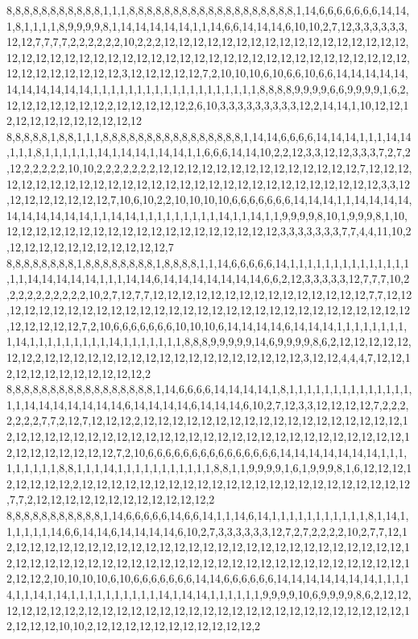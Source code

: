 8,8,8,8,8,8,8,8,8,8,8,1,1,1,8,8,8,8,8,8,8,8,8,8,8,8,8,8,8,8,8,8,8,1,14,6,6,6,6,6,6,6,14,14,1,8,1,1,1,1,8,9,9,9,9,8,1,14,14,14,14,14,1,1,14,6,6,14,14,14,6,10,10,2,7,12,3,3,3,3,3,3,12,12,7,7,7,7,2,2,2,2,2,2,10,2,2,2,12,12,12,12,12,12,12,12,12,12,12,12,12,12,12,12,12,12,12,12,12,12,12,12,12,12,12,12,12,12,12,12,12,12,12,12,12,12,12,12,12,12,12,12,12,12,12,12,12,12,12,12,12,3,12,12,12,12,12,7,2,10,10,10,6,10,6,6,10,6,6,14,14,14,14,14,14,14,14,14,14,14,1,1,1,1,1,1,1,1,1,1,1,1,1,1,1,1,1,1,1,8,8,8,8,9,9,9,9,6,6,9,9,9,9,1,6,2,12,12,12,12,12,12,12,2,12,12,12,12,12,2,6,10,3,3,3,3,3,3,3,3,3,12,2,14,14,1,10,12,12,12,12,12,12,12,12,12,12,12,12
8,8,8,8,8,1,8,8,1,1,1,8,8,8,8,8,8,8,8,8,8,8,8,8,8,8,8,1,14,14,6,6,6,6,14,14,14,1,1,1,14,14,1,1,1,8,1,1,1,1,1,1,14,1,14,14,1,14,14,1,1,6,6,6,14,14,10,2,2,12,3,3,12,12,3,3,3,7,2,7,2,12,2,2,2,2,2,10,10,2,2,2,2,2,2,2,12,12,12,12,12,12,12,12,12,12,12,12,12,12,7,12,12,12,12,12,12,12,12,12,12,12,12,12,12,12,12,12,12,12,12,12,12,12,12,12,12,12,12,12,3,3,12,12,12,12,12,12,12,12,7,10,6,10,2,2,10,10,10,10,6,6,6,6,6,6,6,14,14,14,1,1,14,14,14,14,14,14,14,14,14,14,1,1,14,14,1,1,1,1,1,1,1,1,1,14,1,1,14,1,1,9,9,9,9,8,10,1,9,9,9,8,1,10,12,12,12,12,12,12,12,12,12,12,12,12,12,12,12,12,12,12,12,3,3,3,3,3,3,3,7,7,4,4,11,10,2,12,12,12,12,12,12,12,12,12,12,12,7
8,8,8,8,8,8,8,8,1,8,8,8,8,8,8,8,8,1,8,8,8,8,1,1,14,6,6,6,6,6,14,1,1,1,1,1,1,1,1,1,1,1,1,1,1,1,1,14,14,14,14,14,1,1,1,14,14,6,14,14,14,14,14,14,14,6,6,2,12,3,3,3,3,3,12,7,7,7,10,2,2,2,2,2,2,2,2,2,2,10,2,7,12,7,7,12,12,12,12,12,12,12,12,12,12,12,12,12,12,12,7,7,12,12,12,12,12,12,12,12,12,12,12,12,12,12,12,12,12,12,12,12,12,12,12,12,12,12,12,12,12,12,12,12,12,12,12,7,2,10,6,6,6,6,6,6,6,10,10,10,6,14,14,14,14,6,14,14,14,1,1,1,1,1,1,1,1,1,14,1,1,1,1,1,1,1,1,1,14,1,1,1,1,1,1,1,8,8,8,9,9,9,9,9,14,6,9,9,9,9,8,6,2,12,12,12,12,12,12,12,2,12,12,12,12,12,12,12,12,12,12,12,12,12,12,12,12,12,12,3,12,12,4,4,4,7,12,12,12,12,12,12,12,12,12,12,12,12,2
8,8,8,8,8,8,8,8,8,8,8,8,8,8,8,8,8,1,14,6,6,6,6,14,14,14,14,1,8,1,1,1,1,1,1,1,1,1,1,1,1,1,1,1,1,14,14,14,14,14,14,14,6,14,14,14,14,6,14,14,14,6,10,2,7,12,3,3,12,12,12,12,7,2,2,2,2,2,2,2,7,7,2,12,7,12,12,12,2,12,12,12,12,12,12,12,12,12,12,12,12,12,12,12,12,12,12,12,12,12,12,12,12,12,12,12,12,12,12,12,12,12,12,12,12,12,12,12,12,12,12,12,12,12,12,12,12,12,12,12,12,12,12,7,2,10,6,6,6,6,6,6,6,6,6,6,6,6,6,6,6,14,14,14,14,14,14,14,1,1,1,1,1,1,1,1,1,8,8,1,1,1,14,1,1,1,1,1,1,1,1,1,1,1,8,8,1,1,9,9,9,9,1,6,1,9,9,9,8,1,6,12,12,12,12,12,12,12,12,2,12,12,12,12,12,12,12,12,12,12,12,12,12,12,12,12,12,12,12,12,12,12,12,7,7,2,12,12,12,12,12,12,12,12,12,12,12,12,2
8,8,8,8,8,8,8,8,8,8,8,1,14,6,6,6,6,6,14,6,6,14,1,1,14,6,14,1,1,1,1,1,1,1,1,1,1,1,8,1,14,1,1,1,1,1,1,14,6,6,14,14,6,14,14,14,14,6,10,2,7,3,3,3,3,3,3,12,7,2,7,2,2,2,2,10,2,7,7,12,12,12,12,12,12,12,12,12,12,12,12,12,12,12,12,12,12,12,12,12,12,12,12,12,12,12,12,12,12,12,12,12,12,12,12,12,12,12,12,12,12,12,12,12,12,12,12,12,12,12,12,12,12,12,12,12,12,12,12,2,10,10,10,10,6,10,6,6,6,6,6,6,6,14,14,6,6,6,6,6,6,14,14,14,14,14,14,14,1,1,1,14,1,1,14,1,14,1,1,1,1,1,1,1,1,1,1,14,1,14,14,1,1,1,1,1,1,9,9,9,9,10,6,9,9,9,9,8,6,2,12,12,12,12,12,12,12,2,12,12,12,12,12,12,12,12,12,12,12,12,12,12,12,12,12,12,12,12,12,12,12,12,12,12,10,10,2,12,12,12,12,12,12,12,12,12,12,12,2
